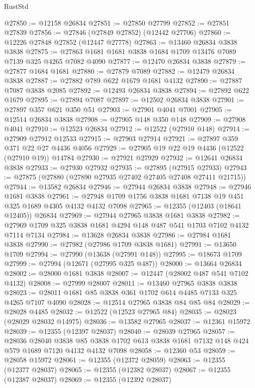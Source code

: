 \begin{lexlean}{RustStd}
\begin{coremodule}
@27850 := @12158 @26834
@27851 := @27850 @27799
@27852 := @27851 @27839
@27856 := @27846 (@27849 @27852) (@12442 @27706)
@27860 := @12226 @27848 @27852 (@12447 @27778)
@27863 := @13460 @26834 @3838 @3838
@27875 := @27863 @1681 @1681 @3838 @1684 @1709 @13476 @7089 @7139 @325 @4265 @7082 @4090
@27877 := @12470 @26834 @3838
@27879 := @27877 @1684 @1681
@27880 := @27879 @7089
@27882 := @12479 @26834 @3838
@27887 := @27882 @789 @622 @1679 @1681 @4132
@27890 := @27887 @7087 @3838 @2085
@27892 := @12493 @26834 @3838
@27894 := @27892 @622 @1679
@27895 := @27894 @7087
@27897 := @12502 @26834 @3838
@27901 := @27897 @357 @621 @350 @51
@27903 := @27901 @4041 @7001
@27905 := @12514 @26834 @3838
@27908 := @27905 @148 @350 @148
@27909 := @27908 @4041
@27910 := @12523 @26834
@27912 := @12522 (@27910 @148)
@27914 := @27909 @27912 @12533
@27915 := @27903 @27914
@27921 := @27897 @359 @371 @22 @27 @4436 @4056
@27929 := @27905 @19 @22 @19 @4436 (@12522 (@27910 @19)) @14784
@27930 := @27921 @27929
@27932 := @12641 @26834 @3838
@27933 := @27930 @27932
@27935 := @27895 (@27915 @27933)
@27943 := @27875 (@27880 (@27890 @27935 @27402 @27405 @27408 @27411 @21715))
@27944 := @13582 @26834
@27946 := @27944 @26834 @3838
@27948 := @27946 @1681 @3838
@27961 := @27948 @1709 @1756 @3838 @1681 @7138 @19 @451 @325 @1689 @4305 @4132 @4132 @7098
@27965 := @12355 (@12403 (@18641 @12405)) @26834
@27969 := @27944 @27965 @3838 @1681 @3838
@27982 := @27969 @1709 @325 @3838 @1681 @4294 @148 @487 @541 @1703 @7102 @4132 @7114 @7134
@27984 := @13628 @26834 @3838
@27986 := @27984 @1681 @3838
@27990 := @27982 (@27986 @1709 @3838 @1681)
@27991 := @13650 @1709
@27994 := @27990 (@13638 (@27991 @148))
@27995 := @18673 @1709
@27999 := @27994 (@12671 (@27995 @325 @487))
@28000 := @13664 @26834
@28002 := @28000 @1681 @3838
@28007 := @12447 (@28002 @487 @541 @7102 @4132)
@28008 := @27999 @28007
@28011 := @13460 @27965 @3838 @3838
@28023 := @28011 @1681 @85 @3838 @361 @1702 @614 @4485 @7133 @325 @4265 @7107 @4090
@28028 := @12514 @27965 @3838 @84 @85 @84
@28029 := @28028 @4485
@28032 := @12522 (@12523 @27965 @84)
@28035 := @28023 (@28029 @28032 @14975)
@28036 := @13582 @27965
@28037 := @12361 @15972
@28039 := @12355 (@12397 @28037)
@28040 := @28039 @27965
@28057 := @28036
    @28040
    @3838
    @85
    @3838
    @1702
    @613
    @3838
    @1681
    @7132
    @148
    @424
    @579
    @1689
    @7120
    @4132
    @4132
    @7098
@28058 := @12360 @53
@28059 := @28058 @15972
@28061 := @12355 (@12372 @28059)
@28063 := @12355 (@12377 @28037)
@28065 := @12355 (@12382 @28037)
@28067 := @12355 (@12387 @28037)
@28069 := @12355 (@12392 @28037)

\end{coremodule}
\end{lexlean}
